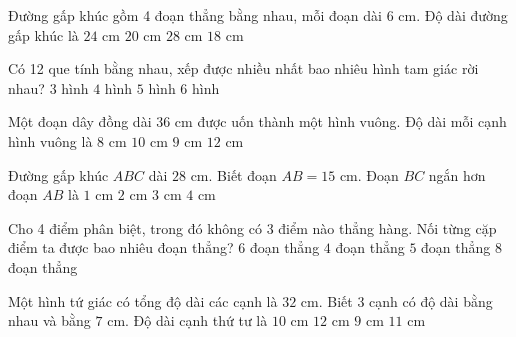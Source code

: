 \begin{ex} %
Đường gấp khúc gồm 4 đoạn thẳng bằng nhau, mỗi đoạn dài $6\text{ cm}$. Độ dài đường gấp khúc là
\choice
{\True $24\text{ cm}$}
{$20\text{ cm}$}
{$28\text{ cm}$}
{$18\text{ cm}$}
\end{ex}

\begin{ex} %
Có 12 que tính bằng nhau, xếp được nhiều nhất bao nhiêu hình tam giác rời nhau?
\choice
{$3$ hình}
{\True $4$ hình}
{$5$ hình}
{$6$ hình}
\end{ex}

\begin{ex} %
Một đoạn dây đồng dài $36\text{ cm}$ được uốn thành một hình vuông. Độ dài mỗi cạnh hình vuông là
\choice
{$8\text{ cm}$}
{$10\text{ cm}$}
{\True $9\text{ cm}$}
{$12\text{ cm}$}
\end{ex}

\begin{ex} %
Đường gấp khúc $ABC$ dài $28\text{ cm}$. Biết đoạn $AB = 15\text{ cm}$. Đoạn $BC$ ngắn hơn đoạn $AB$ là
\choice
{$1\text{ cm}$}
{\True $2\text{ cm}$}
{$3\text{ cm}$}
{$4\text{ cm}$}
\end{ex}

\begin{ex} %
Cho 4 điểm phân biệt, trong đó không có 3 điểm nào thẳng hàng. Nối từng cặp điểm ta được bao nhiêu đoạn thẳng?
\choice
{\True $6$ đoạn thẳng}
{$4$ đoạn thẳng}
{$5$ đoạn thẳng}
{$8$ đoạn thẳng}
\end{ex}

\begin{ex} %
Một hình tứ giác có tổng độ dài các cạnh là $32\text{ cm}$. Biết 3 cạnh có độ dài bằng nhau và bằng $7\text{ cm}$. Độ dài cạnh thứ tư là
\choice
{$10\text{ cm}$}
{$12\text{ cm}$}
{$9\text{ cm}$}
{\True $11\text{ cm}$}
\end{ex}

